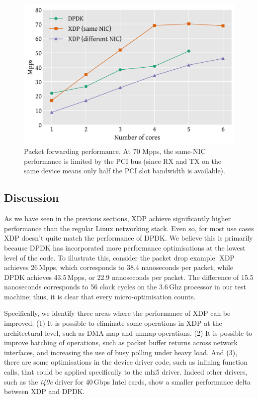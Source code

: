 \documentclass[10pt,sigconf,anonymous]{acmart}
\begin{document}
\begin{figure}[t]
\centering
\includegraphics[width=\linewidth]{figures/redirect-test.pdf}
\caption{\label{fig:redirect-test} Packet forwarding performance. At 70 Mpps,
  the same-NIC performance is limited by the PCI bus (since RX and TX on the
  same device means only half the PCI slot bandwidth is available).}
\end{figure}

\subsection{Discussion}
\label{sec:perf-discussion}

As we have seen in the previous sections, XDP achieve significantly higher
performance than the regular Linux networking stack. Even so, for most use cases
XDP doesn't quite match the performance of DPDK. We believe this is primarily
because DPDK has incorporated more performance optimisations at the lowest level
of the code. To illustrate this, consider the packet drop example: XDP achieves
26\,Mpps, which corresponds to 38.4 nanoseconds per packet, while DPDK achieves
43.5\,Mpps, or 22.9 nanoseconds per packet. The difference of 15.5 nanoseconds
corresponds to 56 clock cycles on the 3.6\,Ghz processor in our test machine;
thus, it is clear that every micro-optimisation counts.

Specifically, we identify three areas where the performance of XDP can be
improved: (1) It is possible to eliminate some operations in XDP at the
architectural level, such as DMA map and unmap operations. (2) It is possible to
improve batching of operations, such as packet buffer returns across network
interfaces, and increasing the use of busy polling under heavy load. And (3),
there are some optimisations in the device driver code, such as inlining
function calls, that could be applied specifically to the mlx5 driver. Indeed
other drivers, such as the \emph{i40e} driver for 40\,Gbps Intel cards, show a
smaller performance delta between XDP and DPDK.
\end{document}
